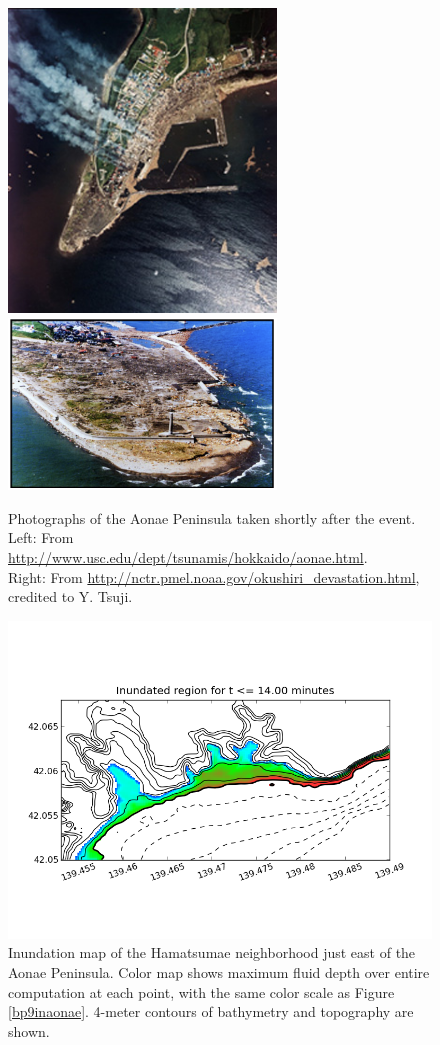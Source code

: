 \begin{figure}[ht]
\hfil\includegraphics[width=2.8in]{bp9/AonaePhoto.jpg}\hfil
\hfil\includegraphics[width=2.8in]{bp9/AonaePhoto2.png}\hfil
\caption{\label{bp9photos}
Photographs of the Aonae Peninsula taken shortly after the event. \\
Left: From \protect\url{http://www.usc.edu/dept/tsunamis/hokkaido/aonae.html}. \\
Right: From \protect\url{http://nctr.pmel.noaa.gov/okushiri\_devastation.html}, credited to Y. Tsuji.
  }
\end{figure}

\begin{figure}[ht]
\hfil\includegraphics[width=5.0in]{bp9/hamatsumae.png}\hfil
\caption{\label{bp9hama}
Inundation map of the Hamatsumae neighborhood just east of the Aonae Peninsula.  Color map shows maximum fluid depth over entire computation at each point, with the same color scale as Figure \protect\ref{bp9inaonae}. 4-meter contours of bathymetry and topography are shown. 
  }
\end{figure}

